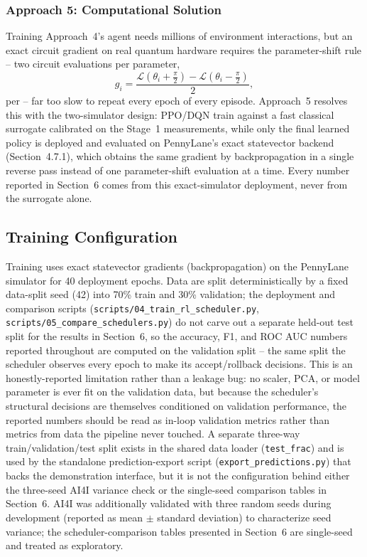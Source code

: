 \subsubsection{Approach 5: Computational Solution}
Training Approach~4's agent needs millions of environment interactions, but an exact circuit gradient on real quantum hardware requires the parameter-shift rule -- two circuit evaluations per parameter,
\begin{equation}
g_i = \frac{\mathcal{L}(\theta_i + \tfrac{\pi}{2}) - \mathcal{L}(\theta_i - \tfrac{\pi}{2})}{2},
\end{equation}
per \citet{mitarai2018quantum,schuld2019evaluating} -- far too slow to repeat every epoch of every episode. Approach~5 resolves this with the two-simulator design: PPO/DQN train against a fast classical surrogate calibrated on the Stage~1 measurements, while only the final learned policy is deployed and evaluated on PennyLane's exact statevector backend (Section~4.7.1), which obtains the same gradient by backpropagation in a single reverse pass instead of one parameter-shift evaluation at a time. Every number reported in Section~6 comes from this exact-simulator deployment, never from the surrogate alone.

\subsection{Training Configuration}
Training uses exact statevector gradients (backpropagation) on the PennyLane simulator for 40 deployment epochs. Data are split deterministically by a fixed data-split seed (42) into 70\% train and 30\% validation; the deployment and comparison scripts (\texttt{scripts/04\_train\_rl\_scheduler.py}, \texttt{scripts/05\_compare\_schedulers.py}) do not carve out a separate held-out test split for the results in Section~6, so the accuracy, F1, and ROC AUC numbers reported throughout are computed on the validation split -- the same split the scheduler observes every epoch to make its accept/rollback decisions. This is an honestly-reported limitation rather than a leakage bug: no scaler, PCA, or model parameter is ever fit on the validation data, but because the scheduler's structural decisions are themselves conditioned on validation performance, the reported numbers should be read as in-loop validation metrics rather than metrics from data the pipeline never touched. A separate three-way train/validation/test split exists in the shared data loader (\texttt{test\_frac}) and is used by the standalone prediction-export script (\texttt{export\_predictions.py}) that backs the demonstration interface, but it is not the configuration behind either the three-seed AI4I variance check or the single-seed comparison tables in Section~6. AI4I was additionally validated with three random seeds during development (reported as mean $\pm$ standard deviation) to characterize seed variance; the scheduler-comparison tables presented in Section~6 are single-seed and treated as exploratory.


